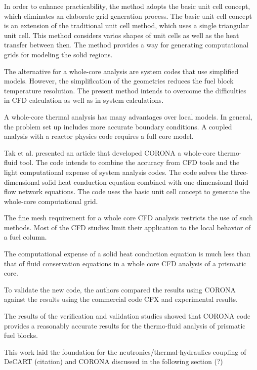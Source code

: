 \documentclass[11pt,letterpaper]{article}
\begin{document}
In order to enhance practicability, the method adopts the basic unit cell concept, which eliminates an elaborate grid generation process.
The basic unit cell concept is an extension of the traditional unit cell method, which uses a single triangular unit cell.
This method considers varios shapes of unit cells as well as the heat transfer between then.
The method provides a way for generating computational grids for modeling the solid regions.

The alternative for a whole-core analysis are system codes that use simplified models.
However, the simplification of the geometries reduces the fuel block temperature resolution.
The present method intends to overcome the difficulties in CFD calculation as well as in system calculations.

A whole-core thermal analysis has many advantages over local models.
In general, the problem set up includes more accurate boundary conditions.
A coupled analysis with a reactor physics code requires a full core model.


Tak et al. \cite{tak_development_2014} presented an article that developed CORONA a whole-core thermo-fluid tool.
The code intends to combine the accuracy from CFD tools and the light computational expense of system analysis codes.
The code solves the three-dimensional solid heat conduction equation combined with one-dimensional fluid flow network equations.
The code uses the basic unit cell concept to generate the whole-core computational grid.

The fine mesh requirement for a whole core CFD analysis restricts the use of such methods.
Most of the CFD studies limit their application to the local behavior of a fuel column.

The computational expense of a solid heat conduction equation is much less than that of fluid conservation equations in a whole core CFD analysis of a prismatic core.

To validate the new code, the authors compared the results using CORONA against the results using the commercial code CFX and experimental results.

The results of the verification and validation studies showed that CORONA code provides a reasonably accurate results for the thermo-fluid analysis of prismatic fuel blocks.

This work laid the foundation for the neutronics/thermal-hydraulics coupling of DeCART (citation) and CORONA discussed in the following section (?)
\end{document}
